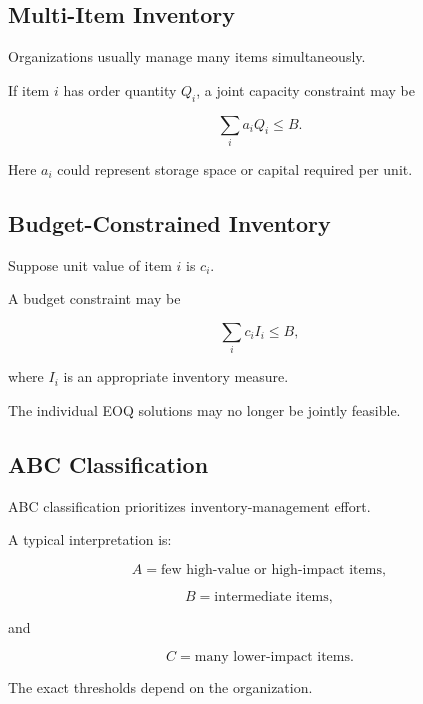 \subsection{Multi-Item Inventory}
\label{subsec:multi-item-inventory}

Organizations usually manage many items simultaneously.

If item \(i\) has order quantity \(Q_i\), a joint capacity constraint may
be

\[
\boxed{
\sum_i
a_iQ_i
\leq
B.
}
\]

Here \(a_i\) could represent storage space or capital required per unit.

\subsection{Budget-Constrained Inventory}
\label{subsec:budget-constrained-inventory}

Suppose unit value of item \(i\) is \(c_i\).

A budget constraint may be

\[
\boxed{
\sum_i
c_i
I_i
\leq
B,
}
\]

where \(I_i\) is an appropriate inventory measure.

The individual EOQ solutions may no longer be jointly feasible.

\subsection{ABC Classification}
\label{subsec:abc-inventory}

ABC classification prioritizes inventory-management effort.

A typical interpretation is:

\[
\boxed{
A
=
\text{few high-value or high-impact items},
}
\]

\[
\boxed{
B
=
\text{intermediate items},
}
\]

and

\[
\boxed{
C
=
\text{many lower-impact items}.
}
\]

The exact thresholds depend on the organization.

